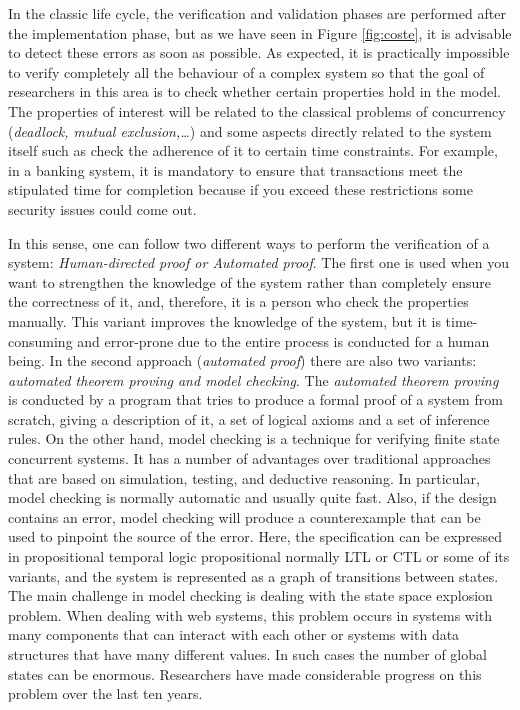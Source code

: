 In the classic life cycle, the verification and validation phases are performed after the implementation phase, 
but as we have seen in Figure \ref{fig:coste}, it is advisable to detect these errors as soon as possible. 
As expected, it is practically impossible to verify completely all the behaviour of a complex 
system so that the goal of researchers in this area is to check whether certain properties hold in the model. 
The properties of interest will be related to the classical problems of concurrency (\emph{deadlock, mutual exclusion,\ldots}) 
and some aspects directly related to the system itself such as check 
the adherence of it to certain time constraints. For example, in a banking system, 
it is mandatory to ensure that transactions meet the stipulated time for completion 
because if you exceed these restrictions some security issues could come out.

In this sense, one can follow two different ways to perform 
the verification of a system: \emph{Human-directed proof or Automated proof}.
The first one is used when you want to strengthen the knowledge of the system 
rather than completely ensure the correctness of it, and, therefore, it is a person who check the properties manually. 
This variant improves the knowledge of the system, but it is time-consuming and 
error-prone due to the entire process is conducted for a human being. 
In the second approach (\emph{automated proof}) there are also two variants: \emph{automated theorem proving and model checking}. 
The \emph{automated theorem proving } is conducted by a program that tries 
to produce a formal proof of a system from scratch, giving a description of it, 
a set of logical axioms and a set of inference rules. On the other hand, model checking \cite{Clarke99} 
is a technique for verifying finite state concurrent systems. It has a number of advantages 
over traditional approaches that are based on simulation, testing, and deductive reasoning. 
In particular, model checking is normally automatic and usually quite fast. Also, if the design contains an error, 
model checking will produce a counterexample that can be used to pinpoint the source of the error. 
Here, the specification can be expressed in propositional temporal logic propositional 
normally LTL \cite{Pnueli77} or CTL \cite{Henzinger94} or some of its variants, 
and the system is represented as a graph of transitions between states. 
The main challenge in model checking is dealing with the state space explosion problem. 
When dealing with web systems, this problem occurs in systems with many components that can interact with 
each other or systems with data structures that have many different values. 
In such cases the number of global states can be enormous. 
Researchers have made considerable progress on this problem over the last ten years. 

